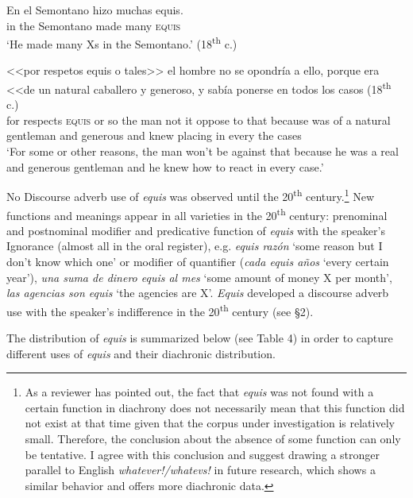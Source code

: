 \documentclass[output=paper
,modfonts
,nonflat]{langsci/langscibook}
\begin{document}
\ea
\gll En el Semontano hizo muchas equis.\\	
in the Semontano made many \textsc{equis}\\
\glt ‘He made many Xs in the Semontano.’ (18\textsuperscript{th} c.)
\z

\ea
\gll <<por respetos equis o tales>> el hombre no se	opondría a ello, porque era <<de un natural caballero y generoso, y sabía ponerse en todos los casos (18\textsuperscript{th} c.)\\
for respects \textsc{equis} or so the man not it oppose to that because was of a natural gentleman and generous and knew placing in every the cases\\
\glt ‘For some or other reasons, the man won’t be against that because he was a real and generous gentleman and he knew how to react in every case.’
\z

No Discourse adverb use of \textit{equis} was observed until the 20\textsuperscript{th} century.\footnote{As a reviewer has pointed out, the fact that \textit{equis} was not found with a certain function in diachrony does not necessarily mean that this function did not exist at that time given that the corpus under investigation is relatively small. Therefore, the conclusion about the absence of some function can only be tentative. I agree with this conclusion and suggest drawing a stronger parallel to English \textit{whatever!/whatevs!} in future research, which shows a similar behavior and offers more diachronic data.}
New functions and meanings appear in all varieties in the 20\textsuperscript{th} century: prenominal and postnominal modifier and predicative function of \textit{equis} with the speaker’s Ignorance (almost all in the oral register), e.g. \textit{equis razón} ‘some reason but I don’t know which one’ or modifier of quantifier (\textit{cada equis años} ‘every certain year’), \textit{una suma de dinero equis al mes} ‘some amount of money X per month’, \textit{las agencias son equis} ‘the agencies are X’. \textit{Equis} developed a discourse adverb use with the speaker’s indifference in the 20\textsuperscript{th} century (see §2).
 
The distribution of \textit{equis} is summarized below (see Table 4) in order to capture different uses of \textit{equis} and their diachronic distribution.
\end{document}
